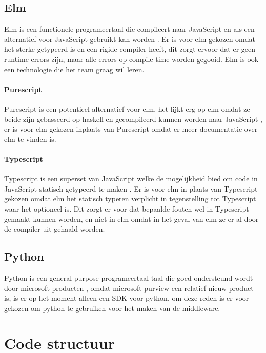 \documentclass[12pt, a4paper]{report}
\begin{document}
    \section{Elm}
    Elm is een functionele programeertaal die compileert naar JavaScript en als een alternatief voor JavaScript gebruikt kan worden \cite{elm}.
    Er is voor elm gekozen omdat het sterke getypeerd is en een rigide compiler heeft,
    dit zorgt ervoor dat er geen runtime errors zijn, maar alle errors op compile time worden gegooid.
    Elm is ook een technologie die het team graag wil leren.
    \subsubsection*{Purescript}
    Purescript is een potentieel alternatief voor elm, het lijkt erg op elm omdat ze beide zijn gebasseerd op haskell en gecompileerd kunnen worden naar JavaScript \cite{purescript},
    er is voor elm gekozen inplaats van Purescript omdat er meer documentatie over elm te vinden is.
    \subsubsection*{Typescript}
    Typescript is een superset van JavaScript welke de mogelijkheid bied om code in JavaScript statisch getypeerd te maken \cite{typescript}.
    Er is voor elm in plaats van Typescript gekozen omdat elm het statisch typeren verplicht in tegenstelling tot Typescript waar het optioneel is.
    Dit zorgt er voor dat bepaalde fouten wel in Typescript gemaakt kunnen worden, en niet in elm omdat in het geval van elm ze er al door de compiler uit gehaald worden.
    \section{Python}
    Python is een general-purpose programeertaal taal die goed ondersteund wordt door microsoft producten \cite{python}\cite{purview-python},
    omdat microsoft purview een relatief nieuw product is,
    is er op het moment alleen een SDK voor python,
    om deze reden is er voor gekozen om python te gebruiken voor het maken van de middleware.

    \chapter{Code structuur}
\end{document}
